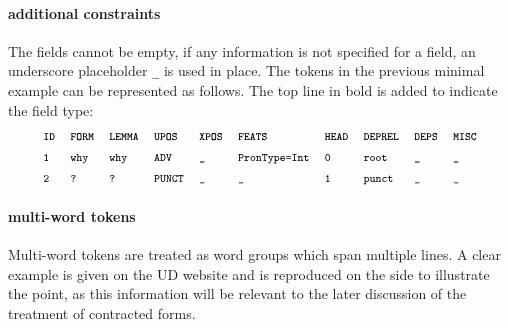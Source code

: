 \paragraph{additional constraints} The fields cannot be empty, if any information  is not specified for a field, an underscore placeholder \texttt{\_} is used in place.
The tokens in the previous minimal example can be represented as follows. The top line in bold is added to indicate the field type:
\begin{align*}
\conllu{\textbf{ID}}\tab\conllu{\textbf{FORM}}\tab\conllu{\textbf{LEMMA}}\tab\conllu{\textbf{UPOS}}\tab\conllu{\textbf{XPOS}}\tab\conllu{\textbf{FEATS}}\tab\conllu{\textbf{HEAD}}\tab\conllu{\textbf{DEPREL}}\tab\conllu{\textbf{DEPS}}\tab\conllu{\textbf{MISC}}\\
\conllu{1}\tab\conllu{why}\tab\conllu{why}\tab\conllu{ADV}\tab\conllu{\_}\tab\conllu{PronType=Int}\tab\conllu{0}\tab\conllu{root}\tab\conllu{\_}\tab\conllu{\_}\\
\conllu{2}\tab\conllu{?}\tab\conllu{?}\tab\conllu{PUNCT}\tab\conllu{\_}\tab\conllu{\_}\tab\conllu{1}\tab\conllu{punct}\tab\conllu{\_}\tab\conllu{\_}
\end{align*}

\paragraph{multi-word tokens}
Multi-word tokens are treated as word groups which span multiple lines. A clear example is given on the UD website and is reproduced on the side to illustrate the point, as this information will be relevant to the later discussion of the treatment of contracted forms.


